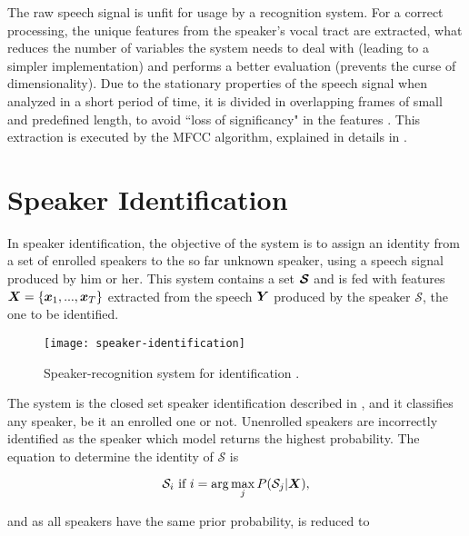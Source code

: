 The raw speech signal is unfit for usage by a recognition system. For a correct processing, the unique features from the speaker's vocal tract are extracted, what reduces the number of variables the system needs to deal with (leading to a simpler implementation) and performs a better evaluation (prevents the curse of dimensionality). Due to the stationary properties of the speech signal when analyzed in a short period of time, it is divided in overlapping frames of small and predefined length, to avoid ``loss of significancy" in the features . This extraction is executed by the MFCC algorithm, explained in details in .

\section{Speaker Identification}

In speaker identification, the objective of the system is to assign an identity from a set of enrolled speakers to the so far unknown speaker, using a speech signal produced by him or her. This system contains a set $\boldsymbol{\mathcal{S}}$ and is fed with features $\boldsymbol{X} = \{\boldsymbol{x}_1, ..., \boldsymbol{x}_T\}$ extracted from the speech $\boldsymbol{Y}$ produced by the speaker $\mathcal{S}$, the one to be identified.

\begin{figure}[ht]
    \centering
    \texttt{[image: speaker-identification]}
    \caption{Speaker-recognition system for identification .}
    \label{fig:speaker-identification}
\end{figure}

\noindent The system is the closed set speaker identification described in , and it classifies any speaker, be it an enrolled one or not. Unenrolled speakers are incorrectly identified as the speaker which model returns the highest probability. The equation to determine the identity of $\mathcal{S}$ is

\begin{equation}
    \mathcal{S}_i \text{ if } i = \arg\max_j \postprob{\mathcal{S}_j}{\dvec{X}},
    \label{eq:decision_speaker_identification}
\end{equation}

\noindent and as all speakers have the same prior probability,  is reduced to

